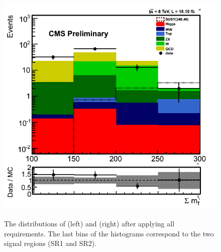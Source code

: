 \begin{figure}[!Hhtb]
\includegraphics[angle=0,scale=0.35]{TauTauFigs/summt.png} \\ 
\caption{The distributions of \mttwo (left) and \SumMT (right) after applying all requirements. 
The last bins of the histograms correspond to the two signal regions (SR1 and SR2). }
\label{fig:comparison}
\end{figure}
